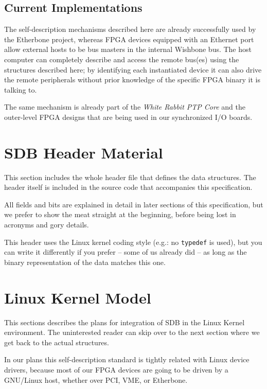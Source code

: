 \documentclass[a4paper, 12pt]{article}
\begin{document}
\subsection{Current Implementations}

The self-description mechanisms described here are already
successfully used by the Etherbone project, whereas FPGA devices
equipped with an Ethernet port allow external hosts to be bus masters
in the internal Wishbone bus.  The host computer can completely
describe and access the remote bus(es) using the structures described
here; by identifying each instantiated device it can also drive the
remote peripherals without prior knowledge of the specific FPGA binary
it is talking to.

The same mechanism is already part of the \textit{White
Rabbit PTP Core} and the outer-level FPGA designs that are
being used in our synchronized I/O boards.


\section{SDB Header Material}

This section includes the whole header file that defines the data
structures. The header itself is included in the source code
that accompanies this specification.

All fields and bits are explained in detail in later sections of this
specification, but we prefer to show the meat straight at the
beginning, before being lost in acronyms and gory details.

This header uses the Linux kernel coding style (e.g.: no \texttt{typedef} is used),
but you can write it differently if you prefer -- some of us already did -- as
long as the binary representation of the data matches this one.

\footnotesize

\normalsize

\section{Linux Kernel Model}

This sections describes the plans for integration of SDB in the Linux
Kernel environment.  The uninterested reader can skip over to the next
section where we get back to the actual structures.

In our plans this self-description standard is tightly related with
Linux device drivers, because most of our FPGA devices are going to be
driven by a GNU/Linux host, whether over PCI, VME, or Etherbone.
\end{document}
